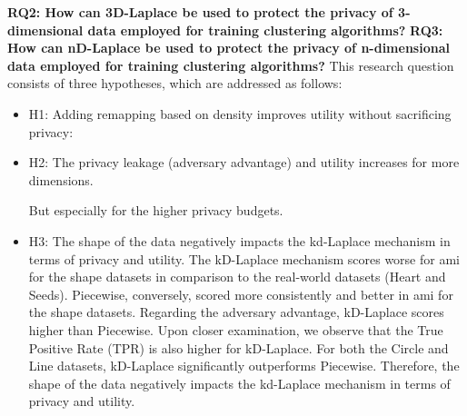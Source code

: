 \textbf{RQ2: How can 3D-Laplace be used to protect the privacy of 3-dimensional data employed for training clustering algorithms?} \newline
{}
\textbf{RQ3: How can nD-Laplace be used to protect the privacy of n-dimensional data employed for training clustering algorithms?} \newline
This research question consists of three hypotheses, which are addressed as follows: \newline
\begin{itemize}
	\item H1: Adding remapping based on density improves utility without sacrificing privacy:

	\item H2: The privacy leakage (adversary advantage) and utility increases for more dimensions.

	      But especially for the higher privacy budgets.
	\item H3: The shape of the data negatively impacts the kd-Laplace mechanism in terms of privacy and utility.
	      The kD-Laplace mechanism scores worse for \gls{ami} for the shape datasets in comparison to the real-world datasets (Heart and Seeds).
	      Piecewise, conversely, scored more consistently and better in \gls{ami} for the shape datasets.
	      Regarding the adversary advantage, kD-Laplace scores higher than Piecewise.
	      Upon closer examination, we observe that the True Positive Rate (TPR) is also higher for kD-Laplace. For both the Circle and Line datasets,
	      kD-Laplace significantly outperforms Piecewise.
	      Therefore, the shape of the data negatively impacts the kd-Laplace mechanism in terms of privacy and utility.
\end{itemize}

